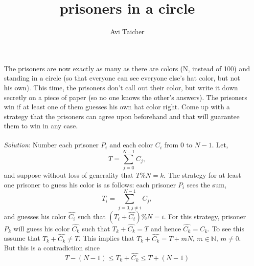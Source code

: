 \documentclass{article}
\begin{document}
%
\title{prisoners in a circle}
%
\author{Avi Taicher}
%
\maketitle
%
The prisoners are now exactly as many as there are colors (N, instead of 100) and standing in a circle (so that everyone can see everyone else's hat color, but not his own). This time, the prisoners don't call out their color, but write it down secretly on a piece of paper (so no one knows the other's answers). The prisoners win if at least one of them guesses his own hat color right. Come up with a strategy that the prisoners can agree upon beforehand and that will guarantee them to win in any case.\\\\
%
\textit{Solution}: Number each prisoner $P_i$ and each color $C_i$
from $0$ to $N-1$. Let,
%
\begin{equation*}
  T = \sum_{j=0}^{N-1}C_j,
\end{equation*}
%
and suppose without loss of generality that $T\%N = k$.  The strategy
for at least one prisoner to guess his color is as follows: each
prisoner $P_i$ sees the sum,
%
\begin{equation*}
  T_i = \sum_{j=0,j \neq i}^{N-1}C_j,
\end{equation*}
%
and guesses his color $\hat{C_i}$ such that $(T_i+\hat{C_i})\%N = i$.
For this strategy, prisoner $P_k$ will guess his color $\hat{C_k}$
such that $T_k + \hat{C_k} = T$ and hence $\hat{C_k} = C_k$.  To see
this assume that $T_k + \hat{C_k} \neq T$.  This implies that $T_k +
\hat{C_k} = T + mN$, $m\in \mathbb{N}$, $m \neq 0$.  But this is a
contradiction since
%
\begin{equation*}
  T-(N-1) \leq T_k + \hat{C_k} \leq T+(N-1)
\end{equation*}
%
\end{document}
